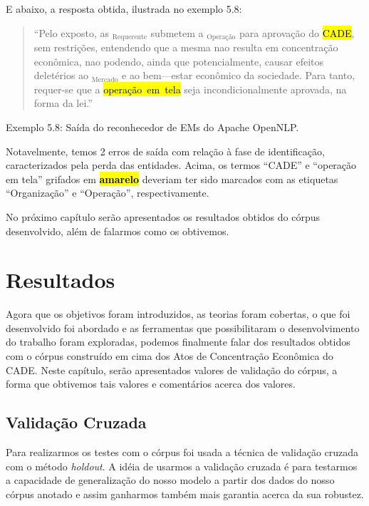 \documentclass[11pt]{report}
\newcommand{\quotes}[1]{``#1''}
\begin{document}
E abaixo, a resposta obtida, ilustrada no exemplo 5.8:

\begin{quote}
  \quotes{Pelo exposto, as $_{\text{Requerente}}$ submetem a \fbox{presente operação}$_{\text{Operação}}$ para aprovação do \hl{\mbox{CADE}}, sem restrições,
  entendendo que a mesma nao resulta em concentração econômica, nao podendo, ainda que potencialmente, causar efeitos deletérios ao \fbox{mercado}$_{\text{Mercado}}$ e
  ao bem—estar econômico da sociedade. Para tanto, requer-se que a \hl{\mbox{operação em tela}} seja incondicionalmente aprovada, na forma da lei.}
\end{quote}
\begin{center}
  Exemplo 5.8: Saída do reconhecedor de EMs do Apache OpenNLP.
\end{center}

Notavelmente, temos 2 erros de saída com relação à fase de identificação, caracterizados pela perda das entidades. Acima, os termos \quotes{CADE} e \quotes{operação em tela}
grifados em \hl{\textbf{amarelo}} deveriam ter sido marcados com as etiquetas \quotes{Organização} e \quotes{Operação}, respectivamente.

No próximo capítulo serão apresentados os resultados obtidos do córpus desenvolvido, além de falarmos como os obtivemos.

\pagebreak
\chapter{Resultados}

\indent\indent Agora que os objetivos foram introduzidos, as teorias foram cobertas, o que foi desenvolvido foi abordado e as ferramentas que possibilitaram o desenvolvimento do trabalho
foram exploradas, podemos finalmente falar dos resultados obtidos com o córpus construído em cima dos Atos de Concentração Econômica do CADE. Neste capítulo, serão apresentados
valores de validação do córpus, a forma que obtivemos tais valores e comentários acerca dos valores.

\section{Validação Cruzada}

\indent\indent Para realizarmos os testes com o córpus foi usada a técnica de validação cruzada com o método \textit{holdout}. A idéia de usarmos a validação cruzada
é para testarmos a capacidade de generalização do nosso modelo a partir dos dados do nosso córpus anotado e assim ganharmos também mais garantia acerca da sua robustez.
\end{document}
